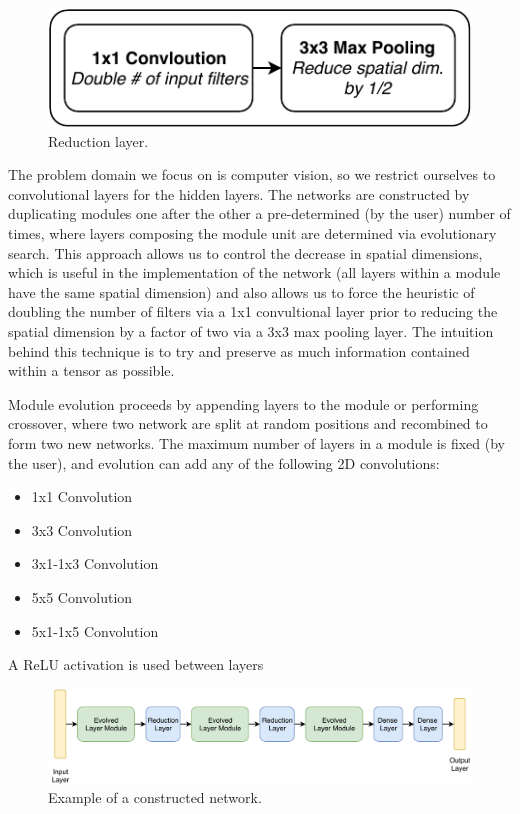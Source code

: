 \documentclass[conference]{IEEEtran}
\begin{document}
\begin{figure}
  \includegraphics{img/reduction}
  \caption{Reduction layer.}
  \label{fig:reduction}
\end{figure}

The problem domain we focus on is computer vision, so we restrict ourselves
to convolutional layers for the hidden layers. The networks are constructed
by duplicating modules one after the other a pre-determined (by the user)
number of times, where layers composing the module unit are
determined via evolutionary search. This approach allows us to control the
decrease in spatial dimensions, which is useful in the implementation of
the network (all layers within a module have the same spatial dimension)
and also allows us to force the heuristic of doubling the number of filters
via a 1x1 convultional layer prior to reducing the spatial dimension by a
factor of two via a 3x3 max pooling layer. The intuition behind this
technique is to try and preserve as much information contained within a
tensor as possible.

Module evolution proceeds by appending layers to the module or performing
crossover, where two network are split at random positions and recombined
to form two new networks. The maximum number of layers in a module is fixed
(by the user), and evolution can add any of the following 2D convolutions:
\begin{itemize}
\item 1x1 Convolution
\item 3x3 Convolution
\item 3x1-1x3 Convolution
\item 5x5 Convolution
\item 5x1-1x5 Convolution
\end{itemize}
A ReLU activation is used between layers

\begin{figure}
  \includegraphics{img/sample_arch}
  \caption{Example of a constructed network.}
  \label{fig:sample-arch}
\end{figure}
\end{document}
